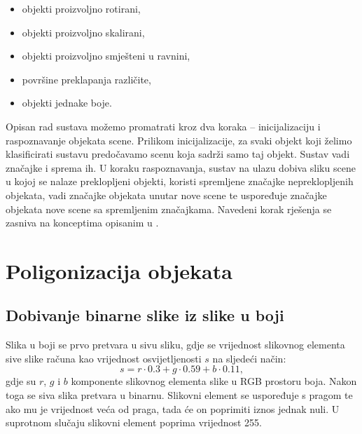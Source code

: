 \documentclass[lmodern, utf8, seminar, numeric]{fer}
\begin{document}
\begin{itemize}
\item objekti proizvoljno rotirani,
\item objekti proizvoljno skalirani,
\item objekti proizvoljno smješteni u ravnini,
\item površine preklapanja različite,
\item objekti jednake boje.
\end{itemize}

Opisan rad sustava možemo promatrati kroz dva koraka -- inicijalizaciju i
raspoznavanje objekata scene. Prilikom inicijalizacije, za svaki objekt koji
želimo klasificirati sustavu predočavamo scenu koja sadrži samo taj objekt.
Sustav vadi značajke i sprema ih. U koraku raspoznavanja, sustav na ulazu dobiva
sliku scene u kojoj se nalaze preklopljeni objekti, koristi spremljene značajke
nepreklopljenih objekata, vadi značajke objekata unutar nove scene te uspoređuje
značajke objekata nove scene sa spremljenim značajkama. Navedeni korak rješenja
se zasniva na konceptima opisanim u \citep{ayache2009hyper}.


\section{Poligonizacija objekata}

\subsection{Dobivanje binarne slike iz slike u boji}
Slika u boji se prvo pretvara u sivu sliku, gdje se vrijednost slikovnog
elementa sive slike računa kao vrijednost osvijetljenosti  
$s$ na sljedeći način:
$$s = r \cdot 0.3 + g \cdot 0.59 + b \cdot 0.11,$$
gdje su $r$, $g$ i $b$ komponente slikovnog elementa slike u RGB prostoru boja.
Nakon toga se siva slika pretvara u binarnu. Slikovni element se uspoređuje s
pragom te ako mu je vrijednost veća od praga, tada će on poprimiti iznos jednak
nuli. U suprotnom slučaju slikovni element poprima vrijednost 255.
\end{document}
